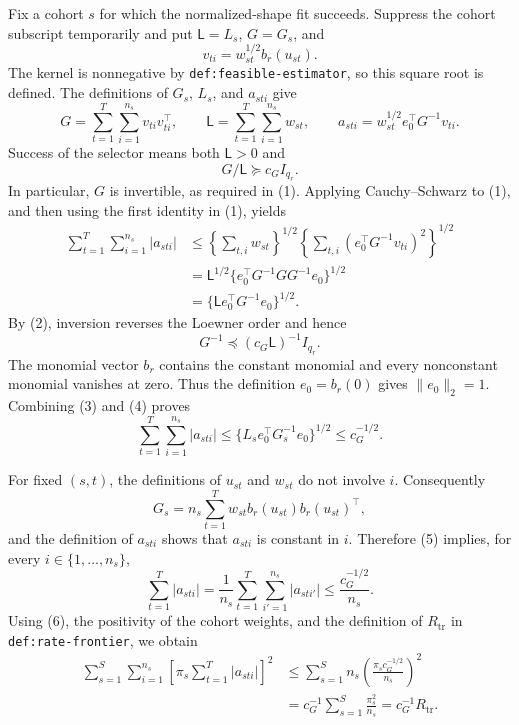 Fix a cohort \(s\) for which the normalized-shape fit succeeds.  Suppress the cohort subscript temporarily and put \(\mathsf L=L_s\), \(G=G_s\), and
\[
v_{ti}=w_{st}^{1/2}b_r(u_{st}).
\]
The kernel is nonnegative by \texttt{def:feasible-estimator}, so this square root is defined.  The definitions of \(G_s\), \(L_s\), and \(a_{sti}\) give
\[
G=\sum_{t=1}^{T}\sum_{i=1}^{n_s}v_{ti}v_{ti}^{\top},
\qquad
\mathsf L=\sum_{t=1}^{T}\sum_{i=1}^{n_s}w_{st},
\qquad
a_{sti}=w_{st}^{1/2}e_0^{\top}G^{-1}v_{ti}.
\tag{1}
\]
Success of the selector means both \(\mathsf L>0\) and
\[
G/\mathsf L\succeq c_G I_{q_r}.
\tag{2}
\]
In particular, \(G\) is invertible, as required in (1).  Applying Cauchy--Schwarz to (1), and then using the first identity in (1), yields
\[
\begin{aligned}
\sum_{t=1}^{T}\sum_{i=1}^{n_s}|a_{sti}|
&\le
\left\{\sum_{t,i}w_{st}\right\}^{1/2}
\left\{\sum_{t,i}
       (e_0^{\top}G^{-1}v_{ti})^2\right\}^{1/2}\\
&=\mathsf L^{1/2}
\{e_0^{\top}G^{-1}GG^{-1}e_0\}^{1/2}\\
&=\{\mathsf L e_0^{\top}G^{-1}e_0\}^{1/2}.
\end{aligned}
\tag{3}
\]
By (2), inversion reverses the Loewner order and hence
\[
G^{-1}\preceq(c_G\mathsf L)^{-1}I_{q_r}.
\tag{4}
\]
The monomial vector \(b_r\) contains the constant monomial and every nonconstant monomial vanishes at zero.  Thus the definition \(e_0=b_r(0)\) gives \(\|e_0\|_2=1\).  Combining (3) and (4) proves
\[
\sum_{t=1}^{T}\sum_{i=1}^{n_s}|a_{sti}|
\le \{L_s e_0^{\top}G_s^{-1}e_0\}^{1/2}
\le c_G^{-1/2}.
\tag{5}
\]

For fixed \((s,t)\), the definitions of \(u_{st}\) and \(w_{st}\) do not involve \(i\).  Consequently
\[
G_s=n_s\sum_{t=1}^{T}w_{st}b_r(u_{st})b_r(u_{st})^{\top},
\]
and the definition of \(a_{sti}\) shows that \(a_{sti}\) is constant in \(i\).  Therefore (5) implies, for every \(i\in\{1,\ldots,n_s\}\),
\[
\sum_{t=1}^{T}|a_{sti}|
=\frac1{n_s}\sum_{t=1}^{T}\sum_{i'=1}^{n_s}|a_{sti'}|
\le \frac{c_G^{-1/2}}{n_s}.
\tag{6}
\]
Using (6), the positivity of the cohort weights, and the definition of \(R_{\mathrm{tr}}\) in \texttt{def:rate-frontier}, we obtain
\[
\begin{aligned}
\sum_{s=1}^{S}\sum_{i=1}^{n_s}
\left[\pi_s\sum_{t=1}^{T}|a_{sti}|\right]^2
&\le \sum_{s=1}^{S}n_s
\left(\frac{\pi_s c_G^{-1/2}}{n_s}\right)^2\\
&=c_G^{-1}\sum_{s=1}^{S}\frac{\pi_s^2}{n_s}
=c_G^{-1}R_{\mathrm{tr}}.
\end{aligned}
\tag{7}
\]

